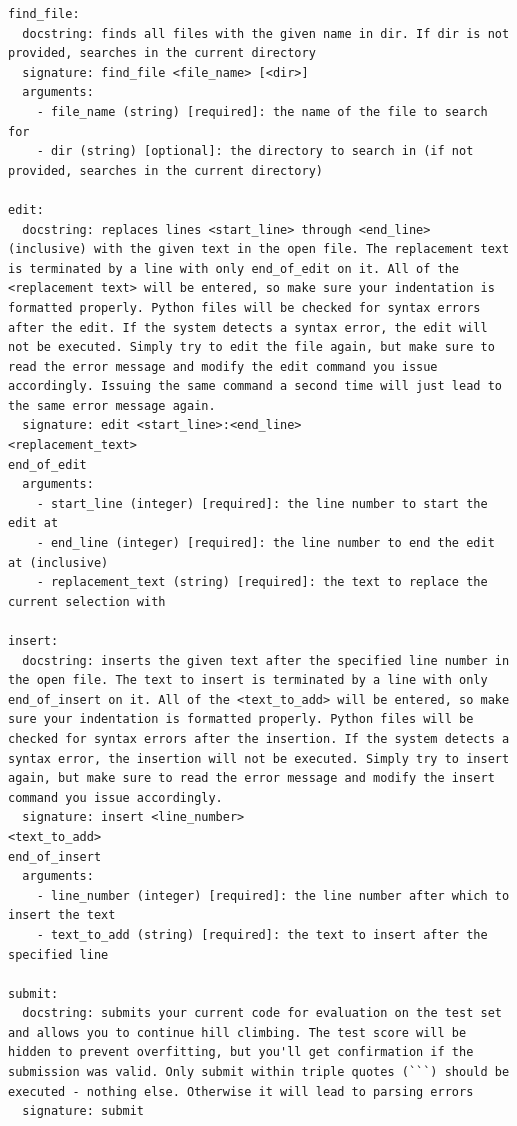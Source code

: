 \documentclass{fairmeta}
\begin{document}
\begin{tcolorbox}[
    colback=md-bg,
    colframe=md-bg,
    boxrule=0pt,
    left=6pt,
    right=6pt,
    top=6pt,
    bottom=6pt,
    enhanced,
    sharp corners,
    breakable
]
\begin{lstlisting}
find_file:
  docstring: finds all files with the given name in dir. If dir is not provided, searches in the current directory
  signature: find_file <file_name> [<dir>]
  arguments:
    - file_name (string) [required]: the name of the file to search for
    - dir (string) [optional]: the directory to search in (if not provided, searches in the current directory)

edit:
  docstring: replaces lines <start_line> through <end_line> (inclusive) with the given text in the open file. The replacement text is terminated by a line with only end_of_edit on it. All of the <replacement text> will be entered, so make sure your indentation is formatted properly. Python files will be checked for syntax errors after the edit. If the system detects a syntax error, the edit will not be executed. Simply try to edit the file again, but make sure to read the error message and modify the edit command you issue accordingly. Issuing the same command a second time will just lead to the same error message again.
  signature: edit <start_line>:<end_line>
<replacement_text>
end_of_edit
  arguments:
    - start_line (integer) [required]: the line number to start the edit at
    - end_line (integer) [required]: the line number to end the edit at (inclusive)
    - replacement_text (string) [required]: the text to replace the current selection with

insert:
  docstring: inserts the given text after the specified line number in the open file. The text to insert is terminated by a line with only end_of_insert on it. All of the <text_to_add> will be entered, so make sure your indentation is formatted properly. Python files will be checked for syntax errors after the insertion. If the system detects a syntax error, the insertion will not be executed. Simply try to insert again, but make sure to read the error message and modify the insert command you issue accordingly.
  signature: insert <line_number>
<text_to_add>
end_of_insert
  arguments:
    - line_number (integer) [required]: the line number after which to insert the text
    - text_to_add (string) [required]: the text to insert after the specified line

submit:
  docstring: submits your current code for evaluation on the test set and allows you to continue hill climbing. The test score will be hidden to prevent overfitting, but you'll get confirmation if the submission was valid. Only submit within triple quotes (```) should be executed - nothing else. Otherwise it will lead to parsing errors
  signature: submit




\end{lstlisting}
\end{tcolorbox}
\end{document}
